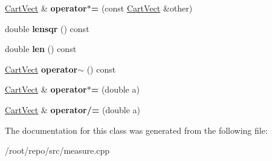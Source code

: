 \begin{DoxyCompactItemize}
\item 
\mbox{\label{class_cart_vect_ae4d813aaf367f7260870b051062a776f}} 
\hyperlink{class_cart_vect}{Cart\+Vect} \& {\bfseries operator$\ast$=} (const \hyperlink{class_cart_vect}{Cart\+Vect} \&other)
\item 
\mbox{\label{class_cart_vect_a4ca12716954a9668ceb70272696aebc7}} 
double {\bfseries lensqr} () const
\item 
\mbox{\label{class_cart_vect_aea5ac128e7effad22c6f825d99a15f9a}} 
double {\bfseries len} () const
\item 
\mbox{\label{class_cart_vect_a24e47226f90a3d0aeb9f14c6c482babc}} 
\hyperlink{class_cart_vect}{Cart\+Vect} {\bfseries operator$\sim$} () const
\item 
\mbox{\label{class_cart_vect_a3dec977a311cf363e0ce7f2983370b10}} 
\hyperlink{class_cart_vect}{Cart\+Vect} \& {\bfseries operator$\ast$=} (double a)
\item 
\mbox{\label{class_cart_vect_aaf0806de8642163882bc844e55fa921f}} 
\hyperlink{class_cart_vect}{Cart\+Vect} \& {\bfseries operator/=} (double a)
\end{DoxyCompactItemize}


The documentation for this class was generated from the following file\+:\begin{DoxyCompactItemize}
\item 
/root/repo/src/measure.\+cpp\end{DoxyCompactItemize}
